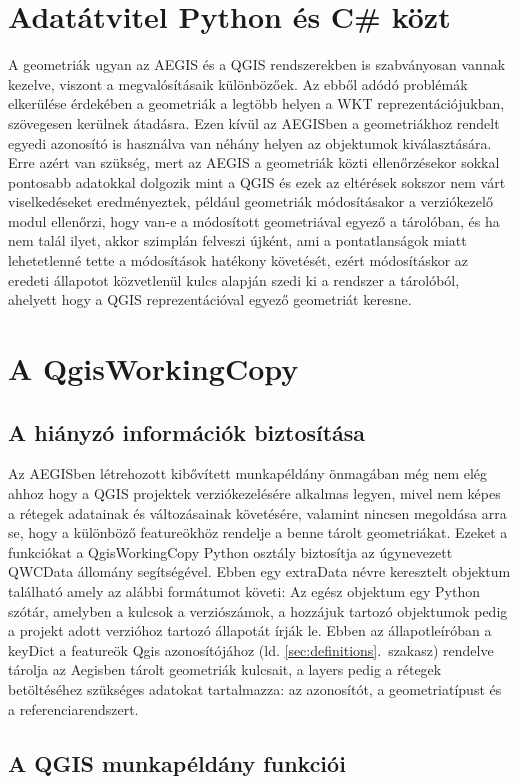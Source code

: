 \section{Adatátvitel Python és C\# közt}
A geometriák ugyan az AEGIS és a QGIS rendszerekben is szabványosan vannak kezelve, viszont a megvalósításaik különbözőek. Az ebből adódó problémák elkerülése érdekében a geometriák a legtöbb helyen a WKT reprezentációjukban, szövegesen kerülnek átadásra. Ezen kívül az AEGISben a geometriákhoz rendelt egyedi azonosító is használva van néhány helyen az objektumok kiválasztására. Erre azért van szükség, mert az AEGIS a geometriák közti ellenőrzésekor sokkal pontosabb adatokkal dolgozik mint a QGIS és ezek az eltérések sokszor nem várt viselkedéseket eredményeztek, például geometriák módosításakor a verziókezelő modul ellenőrzi, hogy van-e a módosított geometriával egyező a tárolóban, és ha nem talál ilyet, akkor szimplán felveszi újként, ami a pontatlanságok miatt lehetetlenné tette a módosítások hatékony követését, ezért módosításkor az eredeti állapotot közvetlenül kulcs alapján szedi ki a rendszer a tárolóból, ahelyett hogy a QGIS reprezentációval egyező geometriát keresne.

\section{A QgisWorkingCopy}
\subsection{A  hiányzó információk biztosítása}
Az AEGISben létrehozott kibővített munkapéldány önmagában még nem elég ahhoz hogy a QGIS projektek verziókezelésére alkalmas legyen, mivel nem képes a rétegek adatainak és változásainak követésére, valamint nincsen megoldása arra se, hogy a különböző featureökhöz rendelje a benne tárolt geometriákat. Ezeket a funkciókat a QgisWorkingCopy Python osztály biztosítja az úgynevezett QWCData állomány segítségével. Ebben egy extraData névre keresztelt objektum található amely az alábbi formátumot követi:
Az egész objektum egy Python szótár, amelyben a kulcsok a verziószámok, a hozzájuk tartozó objektumok pedig a projekt adott verzióhoz tartozó állapotát írják le. Ebben az állapotleíróban a keyDict a featureök Qgis azonosítójához (ld. \ref{sec:definitions}.~szakasz) rendelve tárolja az Aegisben tárolt geometriák kulcsait, a layers pedig a rétegek betöltéséhez szükséges adatokat tartalmazza: az azonosítót, a geometriatípust és a referenciarendszert.
\subsection{A QGIS munkapéldány funkciói}
